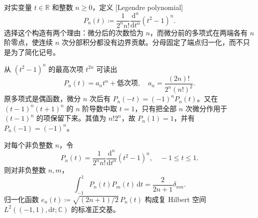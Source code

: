 对实变量 \(t\in\mathbb R\) 和整数 \(n\ge0\)，定义
[Legendre polynomial]
\[
 P_n(t)\coloneqq
 \frac1{2^nn!}\frac{\mathrm d^n}{\mathrm dt^n}(t^2-1)^n.
\]
选择这个构造有两个理由：微分后的次数恰为 \(n\)，而微分前的多项式在两端各有 \(n\) 阶零点，使连续 \(n\) 次分部积分都没有边界贡献。分母固定了端点归一化，而不只是为了简化记号。

\ProseParagraphBreak

从 \((t^2-1)^n\) 的最高次项 \(t^{2n}\) 可读出
\[
 P_n(t)=a_nt^n+\text{低次项},
 \quad a_n=\frac{(2n)!}{2^n(n!)^2}.
\]
原多项式是偶函数，微分 \(n\) 次后有
\(P_n(-t)=(-1)^nP_n(t)\)。又在
\((t-1)^n(t+1)^n\) 的 \(n\) 阶导数中取 \(t=1\)，只有把全部
\(n\) 次微分作用于 \((t-1)^n\) 的项保留下来。其值为
\(n!2^n\)，故 \(P_n(1)=1\)，并有 \(P_n(-1)=(-1)^n\)。

\begin{proposition}
\label{b2:prop:B2-legendre-orthogonal}
对每个非负整数 \(n\)，令
\[
 P_n(t)=\frac1{2^nn!}\frac{\mathrm d^n}{\mathrm dt^n}(t^2-1)^n,
 \quad -1\le t\le1.
\]
则对非负整数 \(n,m\)，
\[
 \int_{-1}^1P_n(t)P_m(t)\,\mathrm dt
 =\frac2{2n+1}\delta_{nm}.
\]
归一化函数
\(e_n(t)\coloneqq\sqrt{(2n+1)/2}\,P_n(t)\)
构成复 Hilbert 空间 \(L^2((-1,1),\mathrm dt;\mathbb C)\) 的标准正交基。
\end{proposition}
